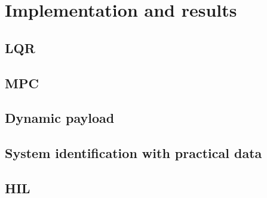 \graphicspath{{results/fig/}}

\chapter{Implementation and results}
\label{chap:results}

    \section{LQR}
    \section{MPC}
    \section{Dynamic payload}
    \section{System identification with practical data}
    \section{HIL}


